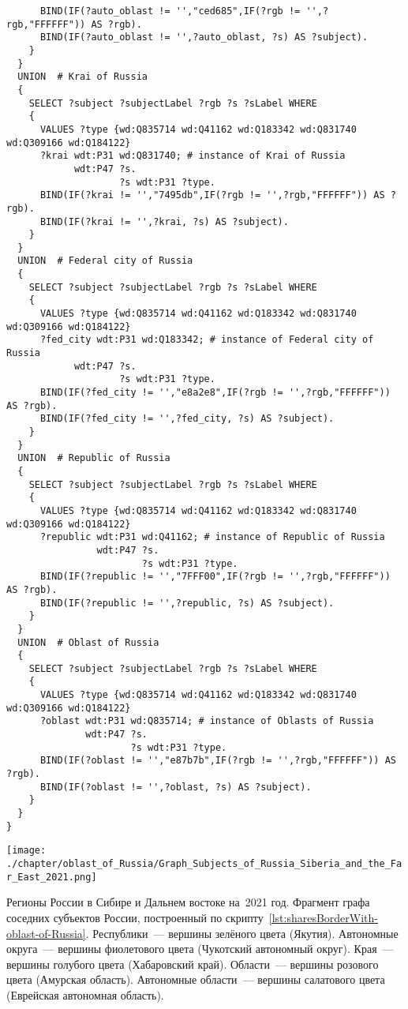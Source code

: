 \begin{lstlisting}
      BIND(IF(?auto_oblast != '',"ced685",IF(?rgb != '',?rgb,"FFFFFF")) AS ?rgb).
      BIND(IF(?auto_oblast != '',?auto_oblast, ?s) AS ?subject).
    }
  }
  UNION  # Krai of Russia
  {
    SELECT ?subject ?subjectLabel ?rgb ?s ?sLabel WHERE
    {
      VALUES ?type {wd:Q835714 wd:Q41162 wd:Q183342 wd:Q831740 wd:Q309166 wd:Q184122}
      ?krai wdt:P31 wd:Q831740; # instance of Krai of Russia
            wdt:P47 ?s.
                    ?s wdt:P31 ?type.
      BIND(IF(?krai != '',"7495db",IF(?rgb != '',?rgb,"FFFFFF")) AS ?rgb).
      BIND(IF(?krai != '',?krai, ?s) AS ?subject).
    }
  }
  UNION  # Federal city of Russia
  {
    SELECT ?subject ?subjectLabel ?rgb ?s ?sLabel WHERE
    {
      VALUES ?type {wd:Q835714 wd:Q41162 wd:Q183342 wd:Q831740 wd:Q309166 wd:Q184122}
      ?fed_city wdt:P31 wd:Q183342; # instance of Federal city of Russia
            wdt:P47 ?s.
                    ?s wdt:P31 ?type.
      BIND(IF(?fed_city != '',"e8a2e8",IF(?rgb != '',?rgb,"FFFFFF")) AS ?rgb).
      BIND(IF(?fed_city != '',?fed_city, ?s) AS ?subject).
    }
  }
  UNION  # Republic of Russia
  {
    SELECT ?subject ?subjectLabel ?rgb ?s ?sLabel WHERE
    {
      VALUES ?type {wd:Q835714 wd:Q41162 wd:Q183342 wd:Q831740 wd:Q309166 wd:Q184122}
      ?republic wdt:P31 wd:Q41162; # instance of Republic of Russia
                wdt:P47 ?s.
                        ?s wdt:P31 ?type.
      BIND(IF(?republic != '',"7FFF00",IF(?rgb != '',?rgb,"FFFFFF")) AS ?rgb).
      BIND(IF(?republic != '',?republic, ?s) AS ?subject).
    }
  }
  UNION  # Oblast of Russia
  {
    SELECT ?subject ?subjectLabel ?rgb ?s ?sLabel WHERE
    {
      VALUES ?type {wd:Q835714 wd:Q41162 wd:Q183342 wd:Q831740 wd:Q309166 wd:Q184122}
      ?oblast wdt:P31 wd:Q835714; # instance of Oblasts of Russia
              wdt:P47 ?s.
                      ?s wdt:P31 ?type.
      BIND(IF(?oblast != '',"e87b7b",IF(?rgb != '',?rgb,"FFFFFF")) AS ?rgb).
      BIND(IF(?oblast != '',?oblast, ?s) AS ?subject).
    }
  }
}
\end{lstlisting}%
%
%
\begin{marginfigure}[1\baselineskip]
	\texttt{[image: ./chapter/oblast\_of\_Russia/Graph\_Subjects\_of\_Russia\_Siberia\_and\_the\_Far\_East\_2021.png]}
	\caption[Фрагмент графа субъектов России, 2021 год.]{Регионы России в Сибире и Дальнем востоке на~2021 год. 
    Фрагмент графа соседних субъектов России, построенный по скрипту~\protect\ref{lst:sharesBorderWith-oblast-of-Russia}.
	Республики~--- вершины зелёного цвета (Якутия).
	Автономные округа~--- вершины фиолетового цвета (Чукотский автономный округ).
	Края~--- вершины голубого цвета (Хабаровский край).
	Области~--- вершины розового цвета (Амурская область).
	Автономные области~--- вершины салатового цвета (Еврейская автономная область).}%
      \label{fig:sharesBorderWith-oblast-of-Russia-Kaliningrad-fig}%
\end{marginfigure}


